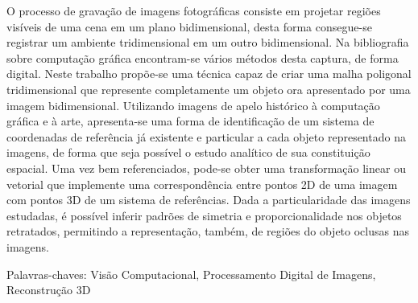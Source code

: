 	O processo de gravação de imagens fotográficas consiste em projetar regiões visíveis de uma cena em um plano bidimensional, desta forma consegue-se registrar um ambiente tridimensional em um outro bidimensional. Na bibliografia sobre computação gráfica encontram-se vários métodos desta captura, de forma digital. Neste trabalho propõe-se uma técnica capaz de criar uma malha poligonal tridimensional que represente completamente um objeto ora apresentado por uma imagem bidimensional. Utilizando imagens de apelo histórico à computação gráfica e à arte, apresenta-se uma forma de identificação de um sistema de coordenadas de referência já existente e particular a cada objeto representado na imagens, de forma que seja possível o estudo analítico de sua constituição espacial. Uma vez bem referenciados, pode-se obter uma transformação linear ou vetorial que implemente uma correspondência entre pontos 2D de uma imagem com pontos 3D de um sistema de referências. Dada a particularidade das imagens estudadas, é possível inferir padrões de simetria e proporcionalidade nos objetos retratados, permitindo a representação, também, de regiões do objeto oclusas nas imagens.

\noindent Palavras-chaves: Visão Computacional, Processamento Digital de Imagens, Reconstrução 3D